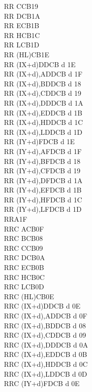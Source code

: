 \documentclass[12pt,twoside,openright,a4paper]{book}
\begin{document}
\begin{multicols}{3}
{\begin{tabbing}
		RR C\>CB19\\
		RR D\>CB1A\\
		RR E\>CB1B\\
		RR H\>CB1C\\
		RR L\>CB1D\\
		RR (HL)\>CB1E\\
		RR (IX+d)\>DDCB d 1E\\
		RR (IX+d),A\UNDOC\>DDCB d 1F\\
		RR (IX+d),B\UNDOC\>DDCB d 18\\
		RR (IX+d),C\UNDOC\>DDCB d 19\\
		RR (IX+d),D\UNDOC\>DDCB d 1A\\
		RR (IX+d),E\UNDOC\>DDCB d 1B\\
		RR (IX+d),H\UNDOC\>DDCB d 1C\\
		RR (IX+d),L\UNDOC\>DDCB d 1D\\
		RR (IY+d)\>FDCB d 1E\\
		RR (IY+d),A\UNDOC\>FDCB d 1F\\
		RR (IY+d),B\UNDOC\>FDCB d 18\\
		RR (IY+d),C\UNDOC\>FDCB d 19\\
		RR (IY+d),D\UNDOC\>FDCB d 1A\\
		RR (IY+d),E\UNDOC\>FDCB d 1B\\
		RR (IY+d),H\UNDOC\>FDCB d 1C\\
		RR (IY+d),L\UNDOC\>FDCB d 1D\\
		RRA\>1F\\
		RRC A\>CB0F\\
		RRC B\>CB08\\
		RRC C\>CB09\\
		RRC D\>CB0A\\
		RRC E\>CB0B\\
		RRC H\>CB0C\\
		RRC L\>CB0D\\
		RRC (HL)\>CB0E\\
		RRC (IX+d)\>DDCB d 0E\\
		RRC (IX+d),A\UNDOC\>DDCB d 0F\\
		RRC (IX+d),B\UNDOC\>DDCB d 08\\
		RRC (IX+d),C\UNDOC\>DDCB d 09\\
		RRC (IX+d),D\UNDOC\>DDCB d 0A\\
		RRC (IX+d),E\UNDOC\>DDCB d 0B\\
		RRC (IX+d),H\UNDOC\>DDCB d 0C\\
		RRC (IX+d),L\UNDOC\>DDCB d 0D\\
		RRC (IY+d)\>FDCB d 0E\\

\end{tabbing}}
\end{multicols}
\end{document}
